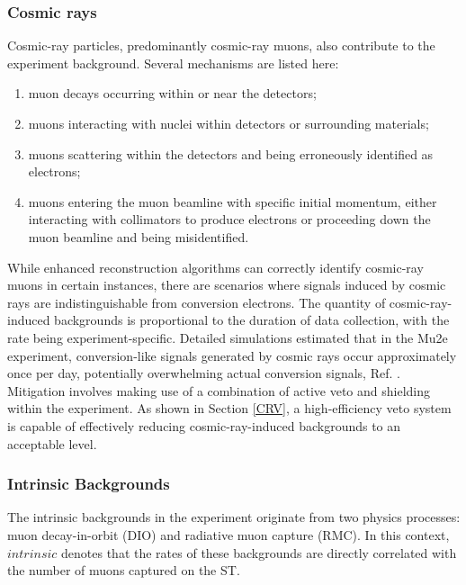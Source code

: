 \subsubsection{Cosmic rays}
Cosmic-ray particles, predominantly cosmic-ray muons, also contribute to the experiment 
background. Several mechanisms are listed here:
\begin{enumerate}
    \item muon decays occurring within or near the detectors;
    \item muons interacting with nuclei within detectors or surrounding materials;
    \item muons scattering within the detectors and being erroneously identified as electrons;
    \item muons entering the muon beamline with specific initial momentum, either 
    interacting with collimators to produce electrons or proceeding down the muon 
    beamline and being misidentified.
\end{enumerate}

While enhanced reconstruction algorithms can correctly identify cosmic-ray muons in 
certain instances, there are scenarios where signals induced by cosmic rays are 
indistinguishable from conversion electrons. The quantity of cosmic-ray-induced 
backgrounds is proportional to the duration of data collection, with the rate being 
experiment-specific. Detailed simulations estimated that in the Mu2e experiment, 
conversion-like signals generated by cosmic rays occur approximately once per day, 
potentially overwhelming actual conversion signals, Ref. \cite{CRVposter}. Mitigation 
involves making use of a combination of active veto and shielding within the experiment. 
As shown in Section \ref{CRV}, a high-efficiency veto system is capable of effectively 
reducing cosmic-ray-induced backgrounds to an acceptable level.
\subsubsection{Intrinsic Backgrounds}
The intrinsic backgrounds in the experiment originate from two physics processes: 
muon decay-in-orbit (DIO) and radiative muon capture (RMC). In this context, 
$intrinsic$ denotes that the rates of these backgrounds are directly correlated 
with the number of muons captured on the ST.
